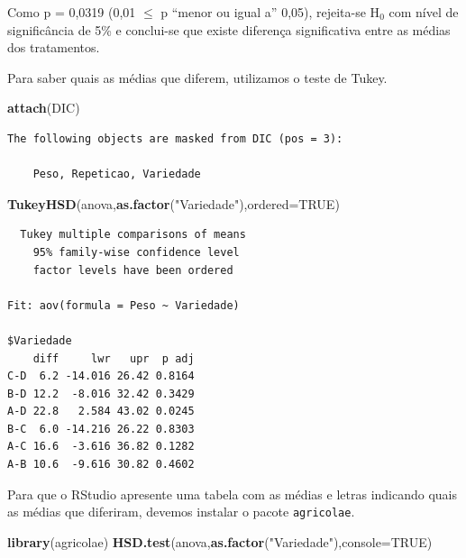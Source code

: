 \documentclass[12pt,brazil,oneside]{book}
\newenvironment{Shaded}{\begin{snugshade}}{\end{snugshade}}
\newcommand{\DataTypeTok}[1]{\textcolor[rgb]{0.13,0.29,0.53}{#1}}
\newcommand{\KeywordTok}[1]{\textcolor[rgb]{0.13,0.29,0.53}{\textbf{#1}}}
\newcommand{\NormalTok}[1]{#1}
\newcommand{\OtherTok}[1]{\textcolor[rgb]{0.56,0.35,0.01}{#1}}
\newcommand{\StringTok}[1]{\textcolor[rgb]{0.31,0.60,0.02}{#1}}
\begin{document}
Como p = 0,0319 (0,01 \(\leq\) p ``menor ou igual a'' 0,05), rejeita-se H\(_0\) com nível de significância de 5\% e conclui-se que existe diferença significativa entre as médias dos tratamentos.

Para saber quais as médias que diferem, utilizamos o teste de Tukey.

\begin{Shaded}
\begin{Highlighting}[]
\KeywordTok{attach}\NormalTok{(DIC)}
\end{Highlighting}
\end{Shaded}

\begin{verbatim}
The following objects are masked from DIC (pos = 3):

    Peso, Repeticao, Variedade
\end{verbatim}

\begin{Shaded}
\begin{Highlighting}[]
\KeywordTok{TukeyHSD}\NormalTok{(anova,}\KeywordTok{as.factor}\NormalTok{(}\StringTok{"Variedade"}\NormalTok{),}\DataTypeTok{ordered=}\OtherTok{TRUE}\NormalTok{)}
\end{Highlighting}
\end{Shaded}

\begin{verbatim}
  Tukey multiple comparisons of means
    95% family-wise confidence level
    factor levels have been ordered

Fit: aov(formula = Peso ~ Variedade)

$Variedade
    diff     lwr   upr  p adj
C-D  6.2 -14.016 26.42 0.8164
B-D 12.2  -8.016 32.42 0.3429
A-D 22.8   2.584 43.02 0.0245
B-C  6.0 -14.216 26.22 0.8303
A-C 16.6  -3.616 36.82 0.1282
A-B 10.6  -9.616 30.82 0.4602
\end{verbatim}

Para que o RStudio apresente uma tabela com as médias e letras indicando quais as médias que diferiram, devemos instalar o pacote \texttt{agricolae}.

\begin{Shaded}
\begin{Highlighting}[]
\KeywordTok{library}\NormalTok{(agricolae)}
\KeywordTok{HSD.test}\NormalTok{(anova,}\KeywordTok{as.factor}\NormalTok{(}\StringTok{"Variedade"}\NormalTok{),}\DataTypeTok{console=}\OtherTok{TRUE}\NormalTok{)}
\end{Highlighting}
\end{Shaded}
\end{document}
